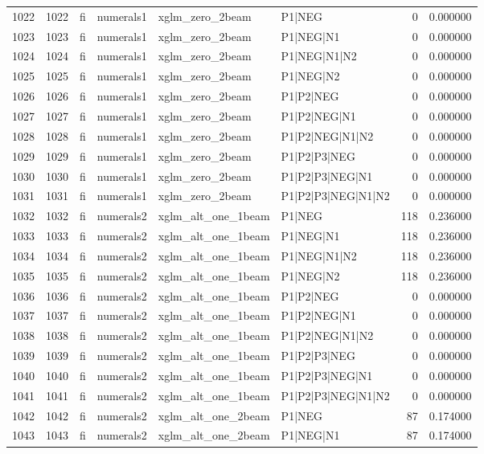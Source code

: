 \begin{tabular}{lrllllrr}
1022 & 1022 & fi & numerals1 & xglm_zero_2beam & P1|NEG & 0 & 0.000000 \\
1023 & 1023 & fi & numerals1 & xglm_zero_2beam & P1|NEG|N1 & 0 & 0.000000 \\
1024 & 1024 & fi & numerals1 & xglm_zero_2beam & P1|NEG|N1|N2 & 0 & 0.000000 \\
1025 & 1025 & fi & numerals1 & xglm_zero_2beam & P1|NEG|N2 & 0 & 0.000000 \\
1026 & 1026 & fi & numerals1 & xglm_zero_2beam & P1|P2|NEG & 0 & 0.000000 \\
1027 & 1027 & fi & numerals1 & xglm_zero_2beam & P1|P2|NEG|N1 & 0 & 0.000000 \\
1028 & 1028 & fi & numerals1 & xglm_zero_2beam & P1|P2|NEG|N1|N2 & 0 & 0.000000 \\
1029 & 1029 & fi & numerals1 & xglm_zero_2beam & P1|P2|P3|NEG & 0 & 0.000000 \\
1030 & 1030 & fi & numerals1 & xglm_zero_2beam & P1|P2|P3|NEG|N1 & 0 & 0.000000 \\
1031 & 1031 & fi & numerals1 & xglm_zero_2beam & P1|P2|P3|NEG|N1|N2 & 0 & 0.000000 \\
1032 & 1032 & fi & numerals2 & xglm_alt_one_1beam & P1|NEG & 118 & 0.236000 \\
1033 & 1033 & fi & numerals2 & xglm_alt_one_1beam & P1|NEG|N1 & 118 & 0.236000 \\
1034 & 1034 & fi & numerals2 & xglm_alt_one_1beam & P1|NEG|N1|N2 & 118 & 0.236000 \\
1035 & 1035 & fi & numerals2 & xglm_alt_one_1beam & P1|NEG|N2 & 118 & 0.236000 \\
1036 & 1036 & fi & numerals2 & xglm_alt_one_1beam & P1|P2|NEG & 0 & 0.000000 \\
1037 & 1037 & fi & numerals2 & xglm_alt_one_1beam & P1|P2|NEG|N1 & 0 & 0.000000 \\
1038 & 1038 & fi & numerals2 & xglm_alt_one_1beam & P1|P2|NEG|N1|N2 & 0 & 0.000000 \\
1039 & 1039 & fi & numerals2 & xglm_alt_one_1beam & P1|P2|P3|NEG & 0 & 0.000000 \\
1040 & 1040 & fi & numerals2 & xglm_alt_one_1beam & P1|P2|P3|NEG|N1 & 0 & 0.000000 \\
1041 & 1041 & fi & numerals2 & xglm_alt_one_1beam & P1|P2|P3|NEG|N1|N2 & 0 & 0.000000 \\
1042 & 1042 & fi & numerals2 & xglm_alt_one_2beam & P1|NEG & 87 & 0.174000 \\
1043 & 1043 & fi & numerals2 & xglm_alt_one_2beam & P1|NEG|N1 & 87 & 0.174000 \\

\end{tabular}
